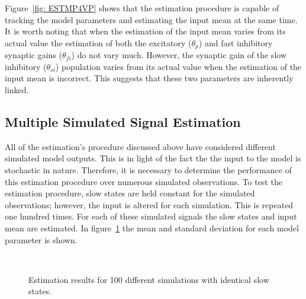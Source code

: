 Figure~\ref{fig: ESTMP4VP} shows that the estimation procedure is capable of tracking the model parameters and estimating the input mean at the same time. It is worth noting that when the estimation of the input mean varies from its actual value the estimation of both the excitatory ($\theta_{p}$) and fast inhibitory synaptic gains ($\theta_{fi}$) do not vary much. However, the synaptic gain of the slow inhibitory ($\theta_{si}$) population varies from its actual value when the estimation of the input mean is incorrect. This suggests that these two parameters are inherently linked. 



\subsection{Multiple Simulated Signal Estimation}
\label{ssec: MSSE}

All of the estimation's procedure discussed above have considered different simulated model outputs. This is in light of the fact the the input to the model is stochastic in nature. Therefore, it is necessary to determine the performance of this estimation procedure over numerous simulated observations. To test the estimation procedure, slow states are held constant for the simulated observations; however, the input is altered for each simulation. This is repeated one hundred times. For each of these simulated signals the slow states and input mean are estimated. In figure~\ref{fig: MultiSim} the mean and standard deviation for each model parameter is shown. 

\begin{figure}[ht]
\centering
{}
\\
\caption{Estimation results for 100 different simulations with identical slow states.}
\label{fig: MultiSim}
\end{figure}
\singlespacing

